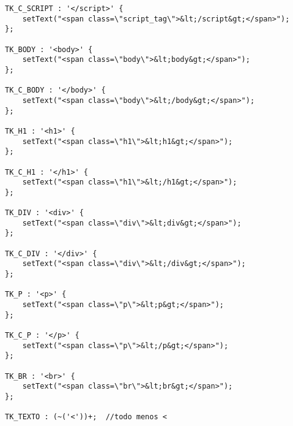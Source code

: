 {\begin{verbatim}
TK_C_SCRIPT : '</script>' {
    setText("<span class=\"script_tag\">&lt;/script&gt;</span>");
};

TK_BODY : '<body>' {
    setText("<span class=\"body\">&lt;body&gt;</span>");
};

TK_C_BODY : '</body>' {
    setText("<span class=\"body\">&lt;/body&gt;</span>");
};

TK_H1 : '<h1>' {
    setText("<span class=\"h1\">&lt;h1&gt;</span>");
};

TK_C_H1 : '</h1>' {
    setText("<span class=\"h1\">&lt;/h1&gt;</span>");
};

TK_DIV : '<div>' {
    setText("<span class=\"div\">&lt;div&gt;</span>");
};

TK_C_DIV : '</div>' {
    setText("<span class=\"div\">&lt;/div&gt;</span>");
};

TK_P : '<p>' {
    setText("<span class=\"p\">&lt;p&gt;</span>");
};

TK_C_P : '</p>' {
    setText("<span class=\"p\">&lt;/p&gt;</span>");
};

TK_BR : '<br>' {
    setText("<span class=\"br\">&lt;br&gt;</span>");
};

TK_TEXTO : (~('<'))+;  //todo menos <
\end{verbatim}
}